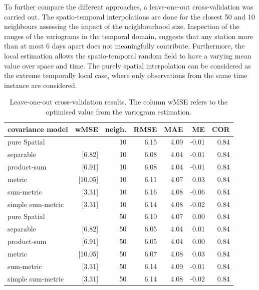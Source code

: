 To further compare the different approaches, a leave-one-out cross-validation was carried out. The spatio-temporal interpolations are done for the closest 50 and 10 neighbours assessing the impact of the neighbourhood size. Inspection of the ranges of the variograms in the temporal domain, suggests that any station more than at most 6 days apart does not meaningfully contribute. Furthermore, the local estimation allows the spatio-temporal random field to have a varying mean value over space and time. The purely spatial interpolation can be considered as the extreme temporally local case, where only observations from the same time instance are considered.


\begin{table}
\caption{Leave-one-out cross-validation results. The column wMSE refers to the optimised value from the variogram estimation.}\label{tab:cv}
\centering
\begin{tabular}{lrr|rrrr}
\toprule
covariance model & wMSE & neigh. &  RMSE   &   MAE   &    ME   &   COR \\ \midrule
pure Spatial & & 10 & 6.15 & 4.09 & -0.01 & 0.84 \\
separable &\hspace{-\tabcolsep}[6.82]&     10 & 6.08 & 4.04 & -0.01 & 0.84  \\
product-sum &\hspace{-\tabcolsep}[6.91]& 10 &  6.08& 4.04& -0.01 & 0.84  \\ 
metric &\hspace{-\tabcolsep}[10.05]&          10 &  6.11 & 4.07 & 0.03 & 0.84  \\ 
sum-metric &\hspace{-\tabcolsep}[3.31]&   10 &  6.16 & 4.08 & -0.06 & 0.84  \\ 
simple sum-metric &\hspace{-\tabcolsep}[3.31]& 10 & 6.14 & 4.08 & -0.02 & 0.84  \\  \midrule
pure Spatial & & 50 & 6.10 & 4.07 & 0.00 & 0.84  \\
separable &\hspace{-\tabcolsep}[6.82]& 50     &  6.05 & 4.04 & 0.01 & 0.84  \\ 
product-sum &\hspace{-\tabcolsep}[6.91]& 50 &  6.05 & 4.04 & 0.00 & 0.84  \\ 
metric &\hspace{-\tabcolsep}[10.05]& 50          &  6.07 & 4.08 & 0.03 & 0.84  \\ 
sum-metric &\hspace{-\tabcolsep}[3.31]& 50   &  6.14 & 4.09 & -0.01 & 0.84  \\ 
simple sum-metric &\hspace{-\tabcolsep}[3.31]& 50 &  6.14 & 4.08 & -0.02 & 0.84 \\ \bottomrule
\end{tabular}
\end{table}

